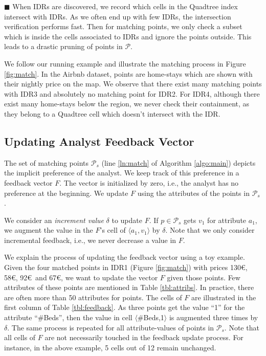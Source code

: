 \documentclass[sigconf,edbt]{acmart-edbt2019}
\begin{document}
\vspace{2pt}
\noindent $\blacksquare$ When IDRs are discovered, we record which cells in the Quadtree index intersect with IDRs. As we often end up with few IDRs, the intersection verification performs fast. Then for matching points, we only check a subset which is inside the cells associated to IDRs and ignore the points outside. This leads to a drastic pruning of points in $\mathcal{P}$.

\vspace{4pt}
We follow our running example and illustrate the matching process in Figure \ref{fig:match}. In the Airbnb dataset, points are home-stays which are shown with their nightly price on the map. We observe that there exist many matching points with IDR3 and absolutely no matching point for IDR2. For IDR4, although there exist many home-stays below the region, we never check their containment, as they belong to a Quadtree cell which doesn't intersect with the IDR. 

\subsection{Updating Analyst Feedback Vector}
The set of matching points $\mathcal{P}_s$ (line \ref{ln:match} of Algorithm \ref{algo:main}) depicts the implicit preference of the analyst. We keep track of this preference in a feedback vector $F$. The vector is initialized by zero, i.e., the analyst has no preference at the beginning. We update $F$ using the attributes of the points in $\mathcal{P}_s$.

\vspace{2pt}
We consider an {\em increment value} $\delta$ to update $F$. If $p \in \mathcal{P}_s$ gets $v_1$ for attribute $a_1$, we augment the value in the $F$'s cell of $\langle a_1, v_1 \rangle$ by $\delta$. Note that we only consider incremental feedback, i.e., we never decrease a value in $F$.

\vspace{2pt}
We explain the process of updating the feedback vector using a toy example. Given the four matched points in IDR1 (Figure \ref{fig:match}) with prices 130\euro, 58\euro, 92\euro\ and 67\euro, we want to update the vector $F$ given those points. Few attributes of these points are mentioned in Table \ref{tbl:attribs}. In practice, there are often more than 50 attributes for points. The cells of $F$ are illustrated in the first column of Table \ref{tbl:feedback}. As three points get the value ``1'' for the attribute ``\#Beds'', then the value in cell $\langle$\#Beds,1$\rangle$ is augmented three times by $\delta$. The same process is repeated for all attribute-values of points in $\mathcal{P}_s$. Note that all cells of $F$ are not necessarily touched in the feedback update process. For instance, in the above example, 5 cells out of 12 remain unchanged.
\end{document}
